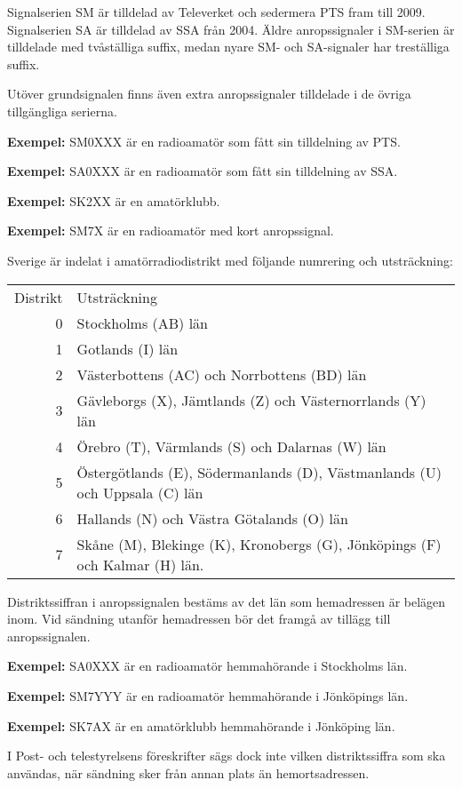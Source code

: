 Signalserien SM är tilldelad av Televerket och sedermera PTS fram till 2009.
Signalserien SA är tilldelad av SSA från 2004.
Äldre anropssignaler i SM-serien är tilldelade med tvåställiga suffix, medan
nyare SM- och SA-signaler har treställiga suffix.

Utöver grundsignalen finns även extra anropssignaler tilldelade i de övriga tillgängliga serierna.

\textbf{Exempel:} SM0XXX är en radioamatör som fått sin tilldelning av PTS.

\textbf{Exempel:} SA0XXX är en radioamatör som fått sin tilldelning av SSA.

\textbf{Exempel:} SK2XX är en amatörklubb.

\textbf{Exempel:} SM7X är en radioamatör med kort anropssignal.

Sverige är indelat i amatörradiodistrikt med följande numrering och
utsträckning:

\begin{tabular}{rp{10cm}}
Distrikt & Utsträckning \\
0 & Stockholms (AB) län \\
1 & Gotlands (I) län \\
2 & Västerbottens (AC) och Norrbottens (BD) län \\
3 & Gävleborgs (X), Jämtlands (Z) och Västernorrlands (Y) län \\
4 & Örebro (T), Värmlands (S) och Dalarnas (W) län \\
5 & Östergötlands (E), Södermanlands (D), Västmanlands (U) och Uppsala (C) län\\
6 & Hallands (N) och Västra Götalands (O) län \\
7 & Skåne (M), Blekinge (K), Kronobergs (G), Jönköpings (F) och Kalmar (H) län.\\
\end{tabular}

Distriktssiffran i anropssignalen bestäms av det län som hemadressen är belägen inom.
Vid sändning utanför hemadressen bör det framgå av tillägg till anropssignalen.

\textbf{Exempel:} SA0XXX är en radioamatör hemmahörande i Stockholms län.

\textbf{Exempel:} SM7YYY är en radioamatör hemmahörande i Jönköpings län.

\textbf{Exempel:} SK7AX är en amatörklubb hemmahörande i Jönköping län.

I Post- och telestyrelsens föreskrifter sägs dock inte vilken distriktssiffra
som ska användas, när sändning sker från annan plats än hemortsadressen.

